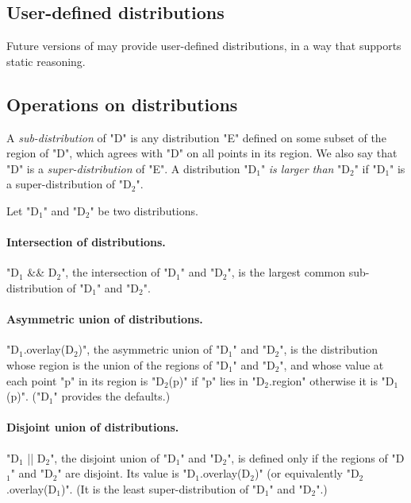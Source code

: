 \subsection{User-defined distributions}

Future versions of \Xten{} may provide user-defined distributions, in
a way that supports static reasoning.

\subsection{Operations on distributions}

A {\em sub-distribution} of \xcd"D" is
any distribution \xcd"E" defined on some subset of the region of
\xcd"D", which agrees with \xcd"D" on all points in its region.
We also say that \xcd"D" is a {\em super-distribution} of
\xcd"E". A distribution \xcdmath"D$_1$" {\em is larger than}
\xcdmath"D$_2$" if \xcdmath"D$_1$" is a super-distribution of
\xcdmath"D$_2$".

Let \xcdmath"D$_1$" and \xcdmath"D$_2$" be two distributions.  


\paragraph{Intersection of distributions.}
\xcdmath"D$_1$ && D$_2$", the intersection of \xcdmath"D$_1$"
and \xcdmath"D$_2$", is the largest common sub-distribution of
\xcdmath"D$_1$" and \xcdmath"D$_2$".

\paragraph{Asymmetric union of distributions.}
\xcdmath"D$_1$.overlay(D$_2$)", the asymmetric union of
\xcdmath"D$_1$" and \xcdmath"D$_2$", is the distribution whose
region is the union of the regions of \xcdmath"D$_1$" and
\xcdmath"D$_2$", and whose value at each point \xcd"p" in its
region is \xcdmath"D$_2$(p)" if \xcdmath"p" lies in
\xcdmath"D$_2$.region" otherwise it is \xcdmath"D$_1$(p)".
(\xcdmath"D$_1$" provides the defaults.)

\paragraph{Disjoint union of distributions.}
\xcdmath"D$_1$ || D$_2$", the disjoint union of \xcdmath"D$_1$"
and \xcdmath"D$_2$", is defined only if the regions of
\xcdmath"D$_1$" and \xcdmath"D$_2$" are disjoint. Its value is
\xcdmath"D$_1$.overlay(D$_2$)" (or equivalently
\xcdmath"D$_2$.overlay(D$_1$)".  (It is the least
super-distribution of \xcdmath"D$_1$" and \xcdmath"D$_2$".)

